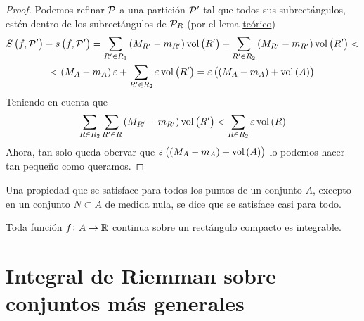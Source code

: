 \begin{proof}
    Podemos refinar $\mathcal{P}$ a una partición $\mathcal{P}^\prime$ tal que todos sus
    subrectángulos, est\'en dentro de los subrectángulos de $\mathcal{P}_R$ (por el lema
    \hyperref[lema:teo_lebesgue]{teórico})
    \begin{gather*}
        S\left( f, \mathcal{P}^\prime \right) - s\left( f, \mathcal{P}^\prime \right) =
        \sum_{R^\prime \in R_1} \left( M_{R^\prime} - m_{R^\prime} \right)
        \operatorname{vol} \left( R^\prime \right) + \sum_{R^\prime \in R_2}
        \left( M_{R^\prime} - m_{R^\prime}\right) \operatorname{vol}\left( R^\prime \right)
        < \\ < \left( M_A - m_A \right)\varepsilon + \sum_{R^\prime \in R_2}
        \varepsilon \operatorname{vol}\left( R^\prime \right) = \varepsilon \left( 
        \left( M_A - m_A \right) + \operatorname{vol} \left( A \right)\right) 
    \end{gather*}
    Teniendo en cuenta que
    \[
        \sum_{R \in R_2} \sum_{R^\prime \in R} \left( M_{R^\prime} - 
        m_{R^\prime}\right) \operatorname{vol}\left( R^\prime \right) < \sum_{R \in R_2}
        \varepsilon \operatorname{vol}\left( R \right)
    \]
    Ahora, tan solo queda obervar que $\varepsilon \left( \left( M_A - m_A \right)
    + \operatorname{vol} \left( A \right)\right)$ lo podemos hacer tan pequeño como queramos.
\end{proof}

\begin{defi}
    Una propiedad que se satisface para todos los puntos de un conjunto $A$,
    excepto en un conjunto $N \subset A$ de medida nula, se dice que se satisface
    casi para todo.
\end{defi}

\begin{prop}
    Toda función $f \colon A \to \mathbb{R}$ continua sobre un rectángulo compacto es
    integrable.
\end{prop}

\section{Integral de Riemman sobre conjuntos más generales}

